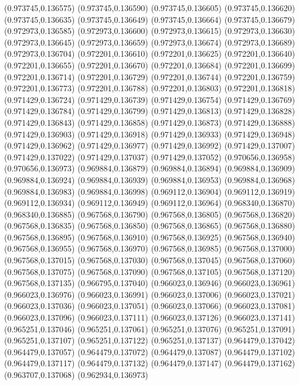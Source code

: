 (0.973745,0.136575)
(0.973745,0.136590)
(0.973745,0.136605)
(0.973745,0.136620)
(0.973745,0.136635)
(0.973745,0.136649)
(0.973745,0.136664)
(0.973745,0.136679)
(0.972973,0.136585)
(0.972973,0.136600)
(0.972973,0.136615)
(0.972973,0.136630)
(0.972973,0.136645)
(0.972973,0.136659)
(0.972973,0.136674)
(0.972973,0.136689)
(0.972973,0.136704)
(0.972201,0.136610)
(0.972201,0.136625)
(0.972201,0.136640)
(0.972201,0.136655)
(0.972201,0.136670)
(0.972201,0.136684)
(0.972201,0.136699)
(0.972201,0.136714)
(0.972201,0.136729)
(0.972201,0.136744)
(0.972201,0.136759)
(0.972201,0.136773)
(0.972201,0.136788)
(0.972201,0.136803)
(0.972201,0.136818)
(0.971429,0.136724)
(0.971429,0.136739)
(0.971429,0.136754)
(0.971429,0.136769)
(0.971429,0.136784)
(0.971429,0.136799)
(0.971429,0.136813)
(0.971429,0.136828)
(0.971429,0.136843)
(0.971429,0.136858)
(0.971429,0.136873)
(0.971429,0.136888)
(0.971429,0.136903)
(0.971429,0.136918)
(0.971429,0.136933)
(0.971429,0.136948)
(0.971429,0.136962)
(0.971429,0.136977)
(0.971429,0.136992)
(0.971429,0.137007)
(0.971429,0.137022)
(0.971429,0.137037)
(0.971429,0.137052)
(0.970656,0.136958)
(0.970656,0.136973)
(0.969884,0.136879)
(0.969884,0.136894)
(0.969884,0.136909)
(0.969884,0.136924)
(0.969884,0.136939)
(0.969884,0.136953)
(0.969884,0.136968)
(0.969884,0.136983)
(0.969884,0.136998)
(0.969112,0.136904)
(0.969112,0.136919)
(0.969112,0.136934)
(0.969112,0.136949)
(0.969112,0.136964)
(0.968340,0.136870)
(0.968340,0.136885)
(0.967568,0.136790)
(0.967568,0.136805)
(0.967568,0.136820)
(0.967568,0.136835)
(0.967568,0.136850)
(0.967568,0.136865)
(0.967568,0.136880)
(0.967568,0.136895)
(0.967568,0.136910)
(0.967568,0.136925)
(0.967568,0.136940)
(0.967568,0.136955)
(0.967568,0.136970)
(0.967568,0.136985)
(0.967568,0.137000)
(0.967568,0.137015)
(0.967568,0.137030)
(0.967568,0.137045)
(0.967568,0.137060)
(0.967568,0.137075)
(0.967568,0.137090)
(0.967568,0.137105)
(0.967568,0.137120)
(0.967568,0.137135)
(0.966795,0.137040)
(0.966023,0.136946)
(0.966023,0.136961)
(0.966023,0.136976)
(0.966023,0.136991)
(0.966023,0.137006)
(0.966023,0.137021)
(0.966023,0.137036)
(0.966023,0.137051)
(0.966023,0.137066)
(0.966023,0.137081)
(0.966023,0.137096)
(0.966023,0.137111)
(0.966023,0.137126)
(0.966023,0.137141)
(0.965251,0.137046)
(0.965251,0.137061)
(0.965251,0.137076)
(0.965251,0.137091)
(0.965251,0.137107)
(0.965251,0.137122)
(0.965251,0.137137)
(0.964479,0.137042)
(0.964479,0.137057)
(0.964479,0.137072)
(0.964479,0.137087)
(0.964479,0.137102)
(0.964479,0.137117)
(0.964479,0.137132)
(0.964479,0.137147)
(0.964479,0.137162)
(0.963707,0.137068)
(0.962934,0.136973)
